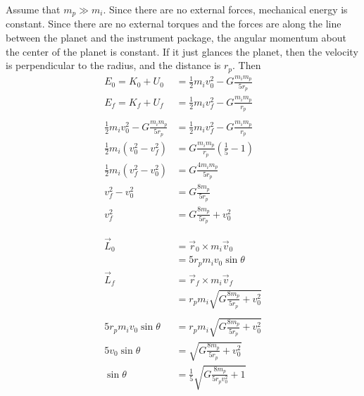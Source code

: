 \documentclass{esg8012pset}
\begin{document}
\begin{solution}
  Assume that $m_p \gg m_i$.  Since there are no external forces, mechanical energy is constant.  Since there are no external torques and the forces are along the line between the planet and the instrument package, the angular momentum about the center of the planet is constant.  If it just glances the planet, then the velocity is perpendicular to the radius, and the distance is $r_p$.  Then
  \begin{align*}
    E_0 = K_0 + U_0 & = \frac{1}{2}m_i v_0^2 - G\frac{m_i m_p}{5 r_p} \\
    E_f = K_f + U_f & = \frac{1}{2}m_i v_f^2 - G\frac{m_i m_p}{r_p} \\
    \\
    \frac{1}{2}m_i v_0^2 - G\frac{m_i m_p}{5 r_p} & = \frac{1}{2}m_i v_f^2 - G\frac{m_i m_p}{r_p} \\
    \frac{1}{2}m_i \left(v_0^2 - v_f^2\right) & = G \frac{m_i m_p}{r_p} \left(\frac{1}{5} - 1\right) \\
    \frac{1}{2}m_i \left(v_f^2 - v_0^2\right) & = G \frac{4 m_i m_p}{5 r_p} \\
    v_f^2 - v_0^2 & = G \frac{8 m_p}{5 r_p} \\
    v_f^2 & = G \frac{8 m_p}{5 r_p} + v_0^2 \\
    \\
    \\
    \vec L_0 & = \vec r_0 \times m_i \vec v_0 \\
    & = 5 r_p m_i v_0\sin\theta \\
    \vec L_f & = \vec r_f \times m_i \vec v_f \\
    & = r_p m_i \sqrt{G \frac{8 m_p}{5 r_p} + v_0^2} \\
    \\
    5 r_p m_i v_0\sin\theta & = r_p m_i \sqrt{G \frac{8 m_p}{5 r_p} + v_0^2} \\
    5 v_0\sin\theta & = \sqrt{G \frac{8 m_p}{5 r_p} + v_0^2} \\
    \sin\theta & = \frac{1}{5}\sqrt{G \frac{8 m_p}{5 r_p v_0^2} + 1}
  \end{align*}



\end{solution}
\end{document}

